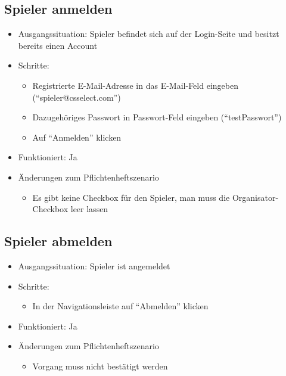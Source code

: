 \documentclass[a4paper]{scrreprt}
\begin{document}
            \subsection{Spieler anmelden}
            \begin{itemize}
                \item Ausgangssituation: Spieler befindet sich auf der Login-Seite und besitzt bereits einen Account
                \item Schritte:
                    \begin{itemize}
                        \item Registrierte E-Mail-Adresse in das E-Mail-Feld eingeben (\enquote{spieler@csselect.com})
                        \item Dazugehöriges Passwort in Passwort-Feld eingeben (\enquote{testPasswort})
                        \item Auf \enquote{Anmelden} klicken
                    \end{itemize}
                \item Funktioniert: Ja
                \item Änderungen zum Pflichtenheftszenario
                \begin{itemize}
                    \item Es gibt keine Checkbox für den Spieler, man muss die Organisator-Checkbox leer lassen
                \end{itemize}
            \end{itemize}

            \subsection{Spieler abmelden}
            \begin{itemize}
                \item Ausgangssituation: Spieler ist angemeldet
                \item Schritte:
                    \begin{itemize}
                        \item In der Navigationsleiste auf \enquote{Abmelden} klicken
                    \end{itemize}
                \item Funktioniert: Ja
                \item Änderungen zum Pflichtenheftszenario
                    \begin{itemize}
                        \item Vorgang muss nicht bestätigt werden
                    \end{itemize}
            \end{itemize}
\end{document}
